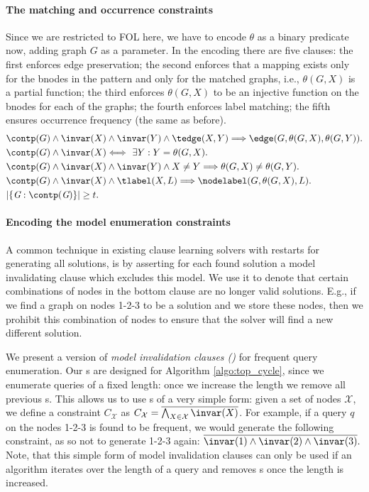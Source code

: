 \paragraph{The matching and occurrence constraints} Since we are restricted to FOL here, we have to encode $\theta$ as a binary predicate now, adding graph $G$ as a parameter. In the encoding there are five clauses: the first enforces edge preservation; the second enforces that a mapping exists only for the bnodes in the pattern and only for the matched graphs, i.e., $\theta(G,X)$ is a partial function; the third enforces $\theta(G,X)$ to be an injective function on the bnodes for each of the graphs; the fourth enforces label matching; the fifth ensures occurrence frequency (the same as before).
\begin{equation}
\begin{aligned}
  &\contp(G) \wedge \invar(X) \wedge \invar(Y) \wedge \tedge(X,Y) \Longrightarrow \edge(G,\theta(G,X), \theta(G,Y)).\\
  &\contp(G) \wedge \invar(X) \Longleftrightarrow \phantom{t} \exists Y: Y=\theta(G,X). \\
  &\contp(G) \wedge \invar(X) \wedge \invar(Y) \wedge X \neq Y \Longrightarrow \theta(G, X) \neq \theta(G, Y). \\
  &\contp(G) \wedge \invar(X) \wedge \tlabel(X,L) \Longrightarrow \nodelabel(G,\theta(G,X),L). \\
  & |\{ \textit{G} : \contp(\textit{G}) \}| \geq t.
\end{aligned}
\label{constr:fol_matching}
\end{equation}
\vspace{-20pt}
\paragraph{Encoding the model enumeration constraints}
A common technique in existing clause learning solvers with restarts for generating all solutions, is by asserting for each found solution a model invalidating clause which excludes this model. We use it to denote that certain combinations of nodes in the bottom clause are no longer valid solutions. E.g., if we find a graph on nodes 1-2-3 to be a solution and we store these nodes, then we prohibit this combination of nodes  to ensure that the solver will find a new different solution.

We present a version of \textit{model invalidation clauses (\mic)} \cite{phd_broes} for frequent query enumeration. Our \mic{}s are designed for Algorithm \ref{algo:top_cycle}, since we enumerate queries of a fixed length: once we increase the length we remove all previous \mic{}s. This allows us to use \mic{}s of a very simple form: given a set of nodes $\mathcal{X}$, we define a constraint $C_{\mathcal{X}}$ as $C_{\mathcal{X}} = \overline{\bigwedge_{X \in \mathcal{X}} \invar(X)}$.
For example, if a query $q$ on the nodes 1-2-3 is found to be frequent, we would generate the following constraint, as so not to generate 1-2-3 again: $\overline{\invar(1) \wedge \invar(2) \wedge \invar(3)}.$
Note, that this simple form of model invalidation clauses can only be used if an algorithm iterates over the length of a query and removes \mic{}s once the length is increased.
